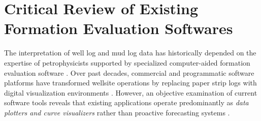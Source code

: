 \section{Critical Review of Existing Formation Evaluation Softwares}

The interpretation of well log and mud log data has historically depended on the expertise of petrophysicists supported by specialized computer-aided formation evaluation software \citep{ref8, wood2020}. Over past decades, commercial and programmatic software platforms have transformed wellsite operations by replacing paper strip logs with digital visualization environments \citep{wood2020}. However, an objective examination of current software tools reveals that existing applications operate predominantly as \textit{data plotters and curve visualizers} rather than proactive forecasting systems \citep{ref8, wood2020}.

